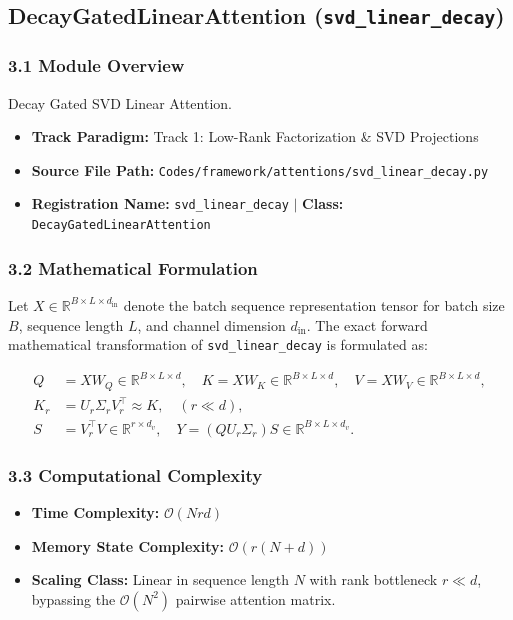 \subsection{DecayGatedLinearAttention (\texttt{svd\_linear\_decay})}
\label{sec:app_module_svd_linear_decay}

\subsubsection*{3.1 Module Overview}
Decay Gated SVD Linear Attention.
\begin{itemize}
    \item \textbf{Track Paradigm:} Track 1: Low-Rank Factorization \& SVD Projections
    \item \textbf{Source File Path:} \texttt{Codes/framework/attentions/svd\_linear\_decay.py}
    \item \textbf{Registration Name:} \texttt{svd\_linear\_decay} $\mid$ \textbf{Class:} \texttt{DecayGatedLinearAttention}
\end{itemize}

\subsubsection*{3.2 Mathematical Formulation}
Let $X \in \mathbb{R}^{B \times L \times d_{\text{in}}}$ denote the batch sequence representation tensor for batch size $B$, sequence length $L$, and channel dimension $d_{\text{in}}$. The exact forward mathematical transformation of \texttt{svd\_linear\_decay} is formulated as:

\begin{align}
Q &= X W_Q \in \mathbb{R}^{B \times L \times d}, \quad K = X W_K \in \mathbb{R}^{B \times L \times d}, \quad V = X W_V \in \mathbb{R}^{B \times L \times d}, \\
K_r &= U_r \Sigma_r V_r^\top \approx K, \quad (r \ll d), \\
S &= V_r^\top V \in \mathbb{R}^{r \times d_v}, \quad Y = (Q U_r \Sigma_r) S \in \mathbb{R}^{B \times L \times d_v}.
\end{align}


\subsubsection*{3.3 Computational Complexity}
\begin{itemize}
    \item \textbf{Time Complexity:} $\mathcal{O}(N r d)$
    \item \textbf{Memory State Complexity:} $\mathcal{O}(r(N + d))$
    \item \textbf{Scaling Class:} Linear in sequence length $N$ with rank bottleneck $r \ll d$, bypassing the $\mathcal{O}(N^2)$ pairwise attention matrix.
\end{itemize}


